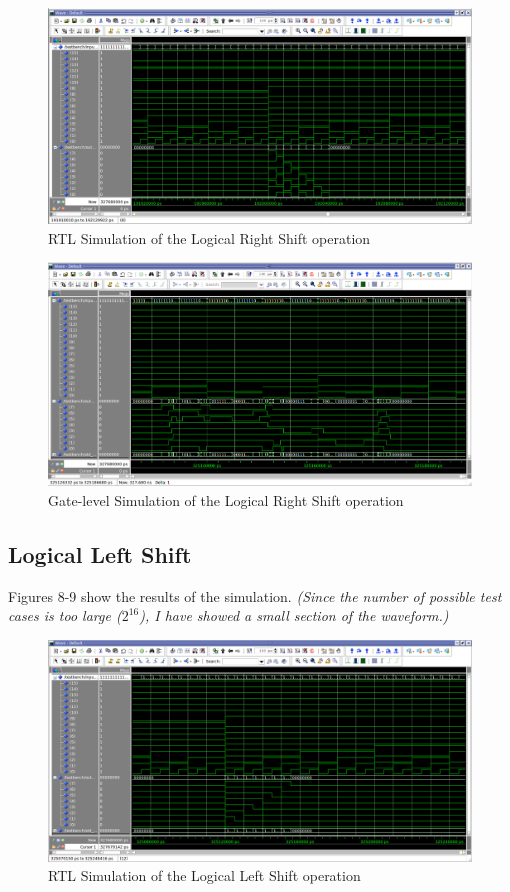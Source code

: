\documentclass[a4paper, 11pt]{article}
\begin{document}
\begin{figure}[H]
\centering
\includegraphics[scale=0.33]{rightshift_RTL}
\caption{RTL Simulation of the Logical Right Shift operation}
\end{figure}

\begin{figure}[H]
\centering
\includegraphics[scale=0.33]{rightshift_Gate}
\caption{Gate-level Simulation of the Logical Right Shift operation}
\end{figure}

\newpage
\subsection{Logical Left Shift}
Figures 8-9 show the results of the simulation. \emph{(Since the number of possible test cases is too large ($2^{16}$), I have showed a small section of the waveform.)}

\begin{figure}[H]
\centering
\includegraphics[scale=0.33]{leftshift_RTL}
\caption{RTL Simulation of the Logical Left Shift operation}
\end{figure}
\end{document}
